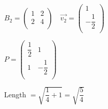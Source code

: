 \documentclass[12pt,letterpaper]{article}
\begin{document}
        $B_2 = \begin{pmatrix}
            1 & 2 \\
            2 & 4 \\
        \end{pmatrix}\quad \vec{v_2} = \begin{pmatrix}
            1 \\
            - \dfrac{1}{2} \\
        \end{pmatrix}$
        
    $P = \begin{pmatrix}
            \dfrac{1}{2} & 1 \\
            1 & -\dfrac{1}{2} \\
        \end{pmatrix}$
        
    Length $ = \sqrt{\dfrac{1}{4} + 1} = \sqrt{\dfrac{5}{4}}$
    
    
\end{document}
